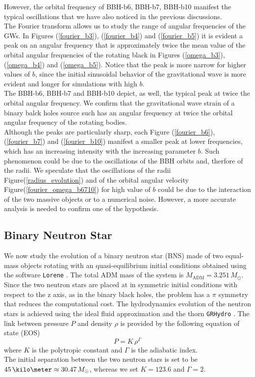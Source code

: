 However, the orbital frequency of BBH-b6, BBH-b7, BBH-b10 manifest the typical oscillations that we have also noticed in the previous discussions.\\
The Fourier transform allows us to study the range of angular frequencies of the GWs.
In Figures (\ref{fourier_b3}), (\ref{fourier_b4}) and (\ref{fourier_b5}) it is evident a peak on an angular frequency that is approximately twice the mean value of the orbital angular frequencies of the rotating black in Figures (\ref{omega_b3}), (\ref{omega_b4}) and (\ref{omega_b5}).
Notice that the peak is more narrow for higher values of $b$, since the initial sinusoidal behavior of the gravitational wave is more evident and longer for simulations with high $b$.\\
The BBH-b6, BBH-b7 and BBH-b10 depict, as well, the typical peak at twice the orbital angular frequency.
We confirm that the gravitational wave strain of a binary balck holes source such has an angular frequency at twice the orbital angular frequency of the rotating bodies.\\
Although the peaks are particularly sharp,  each Figure (\ref{fourier_b6}), (\ref{fourier_b7}) and (\ref{fourier_b10}) manifest a smaller peak at lower frequencies, which has an increasing intensity with the increasing parameter $b$.
Such phenomenon could be due to the oscillations of the BBH orbits and, therfore of the radii.
We speculate that the oscillations of  the radii Figure(\ref{radius_evolution}) and of the orbital angular velocity Figure(\ref{fourier_omega_b6710}) for high value of $b$ could be due to the interaction of the two massive objects or to a numerical noise. However, a more accurate analysis is needed to confirm one of the hypothesis.\\

\pagebreak

\subsection{Binary Neutron Star}
We now study the evolution of a binary neutron star (BNS) made of two equal-mass objects rotating with an quasi-equilibrium initial conditions obtained using the software \texttt{Lorene} \cite{Lorene:web}.
The total ADM mass of the system is $M_{\text{ADM}} = 3.251 \, M_{\odot}$.
Since the two neutron stars are placed at in symmetric initial conditions with respect to the z axis, as in the binary black holes, the problem has a $\pi$ symmetry that reduces the computational cost.
The hydrodynamics evolution of the neutron stars is achieved using the ideal fluid approximation and the thorn \texttt{GRHydro} \cite{moesta_grhydro:_2014}. 
The link between pressure $P$ and density $\rho$ is provided by the following equation of state (EOS)
\[
P = K \, \rho ^{\Gamma}
\]
where $K$ is the polytropic constant and $\Gamma$ is the adiabatic index.\\
The initial separation between the two neutron stars is set to be $45 \, \kilo \meter \approx 30.47 \, M_{\odot}$, whereas we set $K=123.6$ and $\Gamma=2$.\\

